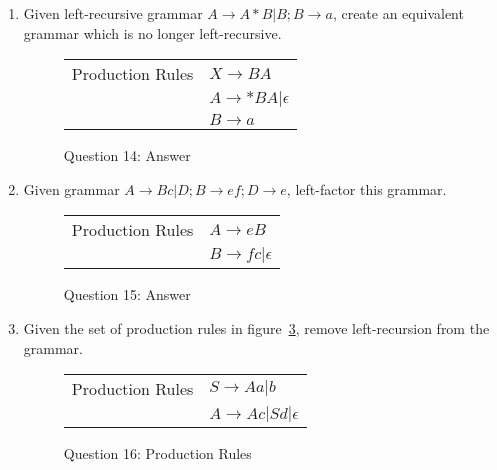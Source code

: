 \documentclass[10pt, oneside, letterpaper]{article}
\begin{document}
\begin{enumerate}
		\clearpage
		
		\item Given left-recursive grammar $A \rightarrow A * B | B; B \rightarrow a$, create an equivalent grammar which is no longer left-recursive.

\begin{figure}[!htb]
	\caption{Question 14: Answer}
	\label{tab:q14-production-rules}
	\begin{center}
		\begin{tabular}{ r | l }
			Production Rules
			& $X \rightarrow BA$ \\
			& $A \rightarrow *BA | \epsilon$ \\
			& $B \rightarrow a$
		\end{tabular}
	\end{center}
\end{figure}

		\clearpage
		
		\item Given grammar $A \rightarrow Bc | D; B \rightarrow ef; D \rightarrow e$, left-factor this grammar.

\begin{figure}[!htb]
	\caption{Question 15: Answer}
	\label{tab:q15-production-rules}
	\begin{center}
		\begin{tabular}{ r | l }
			Production Rules
			& $A \rightarrow eB$ \\
			& $B \rightarrow fc | \epsilon$
		\end{tabular}
	\end{center}
\end{figure}

		\clearpage
		
		\item Given the set of production rules in figure~\ref{tab:q16-production-rules}, remove left-recursion from the grammar.

\begin{figure}[!htb]
	\caption{Question 16: Production Rules}
	\label{tab:q16-production-rules}
	\begin{center}
		\begin{tabular}{ r | l }
			Production Rules
			& $S \rightarrow Aa | b$ \\
			& $A \rightarrow Ac | Sd | \epsilon$ \\
		\end{tabular}
	\end{center}
\end{figure}


\end{enumerate}
\end{document}

